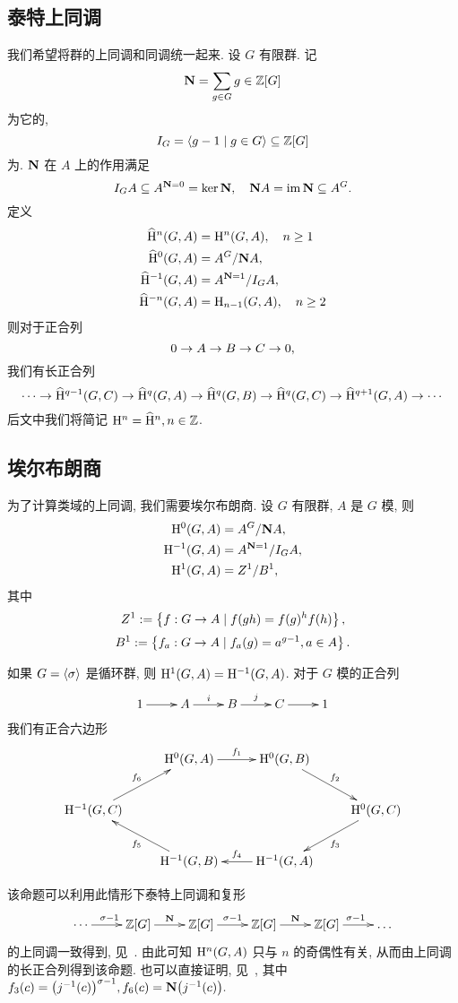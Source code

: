 \subsection{泰特上同调}
我们希望将群的上同调和同调统一起来. 设 $G$ 有限群. 记
  \[{\mathbf{N}}=\sum_{g\in G} g\in{\mathbb{Z}}[G]\]
为它的,
  \[I_G=\langle{g-1\mid g\in G}\rangle\subseteq {\mathbb{Z}}[G]\]
为. ${\mathbf{N}}$ 在 $A$ 上的作用满足
  \[I_GA\subseteq A^{{\mathbf{N}}=0}=\ker {\mathbf{N}},\quad {\mathbf{N}} A={\mathrm{im}\,}{\mathbf{N}}\subseteq A^G.\]
定义
  \[\begin{split}
\widehat{{\mathrm{H}}}^n(G,A)&={\mathrm{H}}^n(G,A),\quad n\ge 1\\
\widehat{{\mathrm{H}}}^0(G,A)&=A^G/{\mathbf{N}} A,\\
\widehat{{\mathrm{H}}}^{-1}(G,A)&=A^{{\mathbf{N}}=1}/I_G A,\\
\widehat{{\mathrm{H}}}^{-n}(G,A)&={\mathrm{H}}_{n-1}(G,A),\quad n\ge 2
\end{split}\]
则对于正合列
  \[0\rightarrow A\rightarrow B\rightarrow C\rightarrow 0,\]
我们有长正合列
  \[\cdots\rightarrow \widehat{{\mathrm{H}}}^{q-1}(G,C)\rightarrow \widehat{{\mathrm{H}}}^q(G,A)\rightarrow \widehat{{\mathrm{H}}}^q(G,B)\rightarrow \widehat{{\mathrm{H}}}^q(G,C)\rightarrow\widehat{{\mathrm{H}}}^{q+1}(G,A)\rightarrow\cdots\]
后文中我们将简记 ${\mathrm{H}}^n=\widehat {{\mathrm{H}}}^n,n\in{\mathbb{Z}}$.

\subsection{埃尔布朗商}
为了计算类域的上同调, 我们需要埃尔布朗商.
设 $G$ 有限群, $A$ 是 $G$ 模, 则
  \[\begin{split}
{\mathrm{H}}^0(G,A)&=A^G/{\mathbf{N}} A,\\
{\mathrm{H}}^{-1}(G,A)&=A^{{\mathbf{N}}=1}/I_G A,\\
{\mathrm{H}}^1(G,A)&=Z^1/B^1,
\end{split}\]
其中
  \[Z^1:=\left\{f:G\to A\mid f(gh)=f(g)^h f(h)\right\},\]
  \[B^1:=\left\{f_a:G\to A\mid f_a(g)=a^{g-1},a\in A\right\}.\]

\begin{proposition}{}{}
如果 $G=\langle{\sigma}\rangle$ 是循环群, 则 ${\mathrm{H}}^1(G,A)={\mathrm{H}}^{-1}(G,A)$.
对于 $G$ 模的正合列
  \[\xymatrix{1\ar[r] &A\ar[r]^i &B\ar[r]^j &C\ar[r] &1}\]
我们有正合六边形
  \[\xymatrix{
    & \rmH^0(G,A)\ar[r]^{f_1} &\rmH^0(G,B)\ar[rd]^{f_2} & \\
    \rmH^{-1}(G,C)\ar[ru]^{f_6}&&&\rmH^0(G,C)\ar[ld]^{f_3}\\
    & \rmH^{-1}(G,B)\ar[lu]^{f_5}& \rmH^{-1}(G,A)\ar[l]_{f_4}&
  }\]
\end{proposition}
该命题可以利用此情形下泰特上同调和复形
  \[\xymatrix{\cdots\ar[r]^{\sigma-1}&\BZ[G]\ar[r]^\bfN&\BZ[G]\ar[r]^{\sigma-1}&\BZ[G]\ar[r]^\bfN&\BZ[G]\ar[r]^{\sigma-1}&\dots}\]
的上同调一致得到, 见~\cite[\S 8.4]{Serre1979}. 由此可知 ${\mathrm{H}}^n(G,A)$ 只与 $n$ 的奇偶性有关, 从而由上同调的长正合列得到该命题.
也可以直接证明, 见~\cite[Proposition~4.3.7, Proposition~4.7.1]{Neukirch1999}, 其中 $f_3(c)=\bigl(j^{-1}(c)\bigr)^{\sigma-1}, f_6(c)={\mathbf{N}}\bigl(j^{-1}(c)\bigr).$

